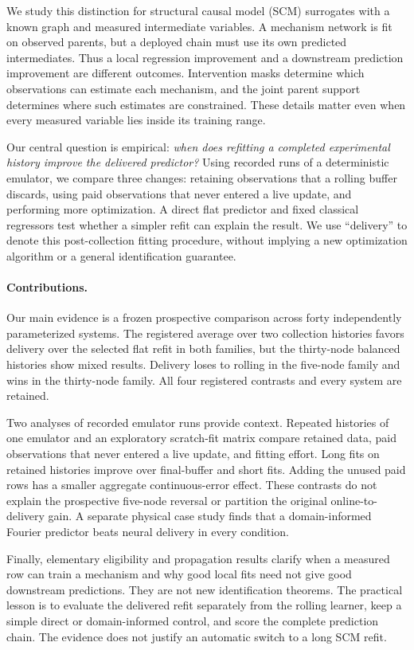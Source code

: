 We study this distinction for structural causal model (SCM) surrogates with a
known graph and measured intermediate variables. A mechanism network is fit on
observed parents, but a deployed chain must use its own predicted intermediates.
Thus a local regression improvement and a downstream prediction improvement
are different outcomes. Intervention masks determine which observations can
estimate each mechanism, and the joint parent support determines where such
estimates are constrained. These details matter even when every measured
variable lies inside its training range.

Our central question is empirical: \emph{when does refitting a completed
experimental history improve the delivered predictor?} Using recorded runs of a deterministic
emulator, we compare three changes: retaining observations that a rolling buffer discards,
using paid observations that never entered a live update, and performing more
optimization. A direct flat predictor and fixed classical regressors test
whether a simpler refit can explain the result. We use ``delivery'' to denote
this post-collection fitting procedure, without implying a new optimization
algorithm or a general identification guarantee.

\paragraph{Contributions.}
Our main evidence is a frozen prospective comparison across forty independently
parameterized systems. The registered average over two collection histories
favors delivery over the selected flat refit in both families, but the
thirty-node balanced histories show mixed results. Delivery loses to rolling
in the five-node family and wins in the thirty-node family. All four registered
contrasts and every system are retained.

Two analyses of recorded emulator runs provide context. Repeated histories of one emulator and
an exploratory scratch-fit matrix compare retained data, paid observations
that never entered a live update, and fitting effort. Long fits on retained
histories improve over final-buffer and short fits. Adding the unused paid rows
has a smaller aggregate continuous-error effect. These contrasts do not explain
the prospective five-node reversal or partition the original online-to-delivery
gain. A separate physical case study finds that a domain-informed Fourier
predictor beats neural delivery in every condition.

Finally, elementary eligibility and propagation results clarify when a measured
row can train a mechanism and why good local fits need not give good downstream
predictions. They are not new identification theorems. The practical lesson is
to evaluate the delivered refit separately from the rolling learner, keep a
simple direct or domain-informed control, and score the complete prediction
chain. The evidence does not justify an automatic switch to a long SCM refit.

